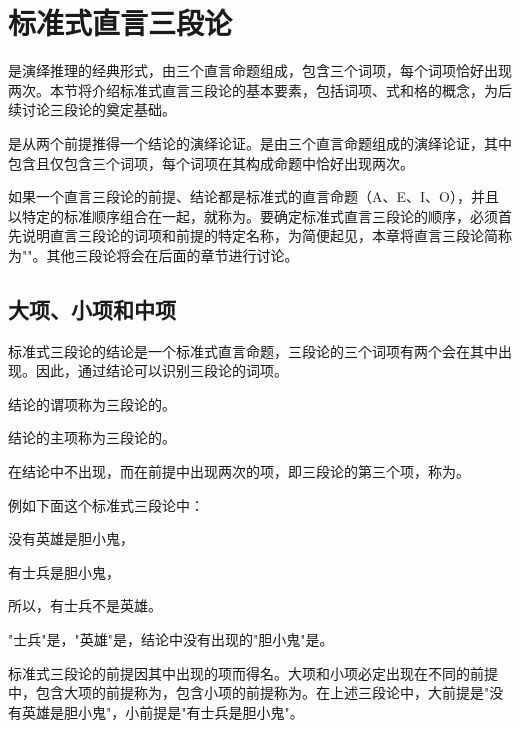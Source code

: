 \section{标准式直言三段论}

\begin{logicbox}[title=引言]
是演绎推理的经典形式，由三个直言命题组成，包含三个词项，每个词项恰好出现两次。本节将介绍标准式直言三段论的基本要素，包括词项、式和格的概念，为后续讨论三段论的奠定基础。
\end{logicbox}

是从两个前提推得一个结论的演绎论证。是由三个直言命题组成的演绎论证，其中包含且仅包含三个词项，每个词项在其构成命题中恰好出现两次。

如果一个直言三段论的前提、结论都是标准式的直言命题（A、E、I、O），并且以特定的标准顺序组合在一起，就称为。要确定标准式直言三段论的顺序，必须首先说明直言三段论的词项和前提的特定名称，为简便起见，本章将直言三段论简称为""。其他三段论将会在后面的章节进行讨论。

\subsection{大项、小项和中项}
\begin{theorembox}[title=三段论词项的定义]
标准式三段论的结论是一个标准式直言命题，三段论的三个词项有两个会在其中出现。因此，通过结论可以识别三段论的词项。

结论的谓项称为三段论的。

结论的主项称为三段论的。

在结论中不出现，而在前提中出现两次的项，即三段论的第三个项，称为。
\end{theorembox}

\begin{examplebox}[title=三段论词项识别示例]
例如下面这个标准式三段论中：

没有英雄是胆小鬼，

有士兵是胆小鬼，

所以，有士兵不是英雄。

"士兵"是，"英雄"是，结论中没有出现的"胆小鬼"是。
\end{examplebox}

标准式三段论的前提因其中出现的项而得名。大项和小项必定出现在不同的前提中，包含大项的前提称为，包含小项的前提称为。在上述三段论中，大前提是"没有英雄是胆小鬼"，小前提是"有士兵是胆小鬼"。

